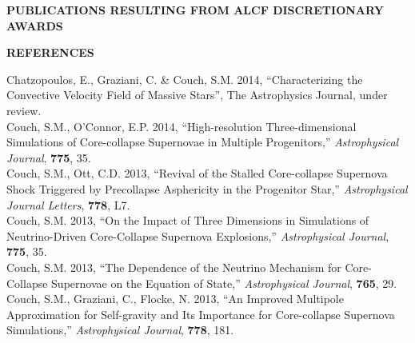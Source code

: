 \documentclass[12pt,letterpaper,english]{article}
\begin{document}
\setlength{\parindent}{0in} %


\pagestyle{fancy}   \renewcommand{%
\headrulewidth}{0.0pt}

\begin{center}
\bf \large {PUBLICATIONS RESULTING FROM ALCF DISCRETIONARY AWARDS} \\
\end{center}
\vspace{-.25in}
{\noindent \bf \large {REFERENCES
}}

\leftskip 0.25in
 \parindent -0.25in
Chatzopoulos, E., Graziani, C. \& Couch, S.M. 2014, ``Characterizing the Convective Velocity
Field of Massive Stars'', The Astrophysics Journal, under review. \\
 Couch, S.M., O'Connor, E.P. 2014, ``High-resolution Three-dimensional Simulations of Core-collapse Supernovae in Multiple Progenitors,''
  {\it Astrophysical Journal}, {\bf 775}, 35. \\
 Couch, S.M., Ott, C.D. 2013, ``Revival of the Stalled Core-collapse Supernova Shock Triggered by Precollapse Asphericity in the Progenitor Star,''
  {\it Astrophysical Journal Letters}, {\bf 778}, L7. \\ 
 Couch, S.M. 2013, ``On the Impact of Three Dimensions in
  Simulations of Neutrino-Driven Core-Collapse Supernova Explosions,''
  {\it Astrophysical Journal}, {\bf 775}, 35. \\ 
 Couch, S.M. 2013, ``The Dependence of the Neutrino
  Mechanism for Core-Collapse Supernovae on the Equation of State,''
  {\it Astrophysical Journal}, {\bf 765}, 29. \\ 
 Couch, S.M., Graziani, C., Flocke, N. 2013, ``An Improved Multipole Approximation for Self-gravity and Its Importance for Core-collapse Supernova Simulations,''
  {\it Astrophysical Journal}, {\bf 778}, 181. \\ 
\end{document}
